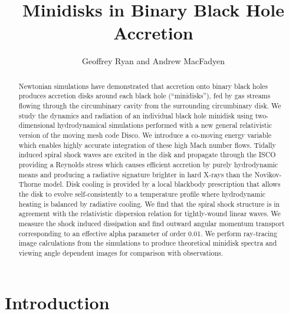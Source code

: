 \documentclass{emulateapj}
\begin{document}
\title{Minidisks in Binary Black Hole Accretion}
\author{Geoffrey Ryan and Andrew MacFadyen}

\begin{abstract}

Newtonian simulations have demonstrated that accretion onto binary black holes produces accretion disks around each black hole (``minidisks''), fed by gas streams flowing through the circumbinary cavity from the surrounding circumbinary disk. We study the dynamics and radiation of an individual black hole minidisk using two-dimensional hydrodynamical simulations performed with a new general relativistic version of the moving mesh code Disco. We introduce a co-moving energy variable which enables highly accurate integration of these high Mach number flows. Tidally induced spiral shock waves are excited in the disk and propagate through the ISCO providing a Reynolds stress which causes efficient accretion by purely hydrodynamic means and producing a radiative signature brighter in hard X-rays than the Novikov-Thorne model. Disk cooling is provided by a local blackbody prescription that allows the disk to evolve self-consistently to a temperature profile where hydrodynamic heating is balanced by radiative cooling. We find that the spiral shock structure is in agreement with the relativistic dispersion relation for tightly-wound linear waves. We measure the shock induced dissipation and find outward angular momentum transport corresponding to an effective alpha parameter of order 0.01. We perform ray-tracing image calculations from the simulations to produce theoretical minidisk spectra and viewing angle dependent images for comparison with observations.

\end{abstract}



\section{Introduction}
\label{sec:intro}
\end{document}
